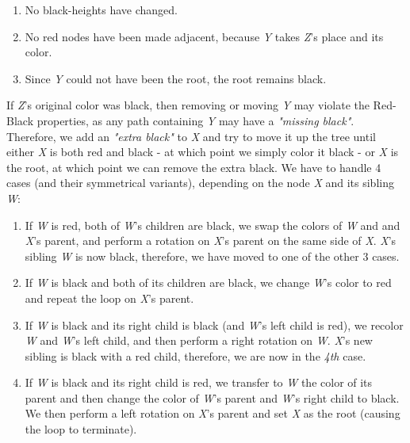 \documentclass[14pt]{article}
\begin{document}
    \begin{enumerate}
        \item No black-heights have changed.
        \item No red nodes have been made adjacent, because \textit{Y} takes \textit{Z}'s place and its color.
        \item Since \textit{Y} could not have been the root, the root remains black.
    \end{enumerate}
If \textit{Z}'s original color was black, then removing or moving \textit{Y} may violate the Red-Black properties,
    as any path containing \textit{Y} may have a \textit{"missing black"}. \newline
    Therefore, we add an \textit{"extra black"} to \textit{X} and try to move it up the tree until either
    \textit{X} is both red and black - at which point we simply color it black - or \textit{X} is the root, at which
    point we can remove the extra black. \newline
    We have to handle 4 cases (and their symmetrical variants), depending on the node \textit{X}
    and its sibling \textit{W}:
    \begin{enumerate}
        \item If \textit{W} is red, both of \textit{W}'s children are black, we swap the colors of \textit{W} and
        and \textit{X}'s parent, and perform a rotation on \textit{X}'s parent on the same side of \textit{X}. \newline
        \textit{X}'s sibling \textit{W} is now black, therefore, we have moved to one of the other 3 cases.
        \item If \textit{W} is black and both of its children are black, we change \textit{W}'s color to red and repeat
        the loop on \textit{X}'s parent.
        \item If \textit{W} is black and its right child is black (and \textit{W}'s left child is red),
        we recolor \textit{W} and \textit{W}'s left child, and then perform a right rotation on \textit{W}.
        \textit{X}'s new sibling is black with a red child, therefore, we are now in the \textit{4th} case.
        \item If \textit{W} is black and its right child is red, we transfer to \textit{W} the color of its parent and
        then change the color of \textit{W}'s parent and \textit{W}'s right child to black. \newline
        We then perform a left rotation on \textit{X}'s parent and set \textit{X} as the root
        (causing the loop to terminate).
    \end{enumerate}
\end{document}

